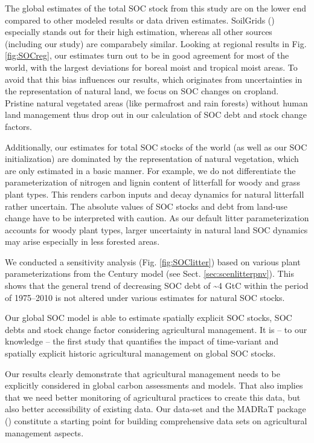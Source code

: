 \documentclass[gc, manuscript]{copernicus}
\begin{document}
The global estimates of the total SOC stock from this study are on the lower end compared to other modeled results or data driven estimates. SoilGrids (\citep{hengl_soilgrids250m_2017}) especially stands out for their high estimation, whereas all other sources (including our study) are comparabely similar. Looking at regional results in Fig. \ref{fig:SOCreg}, our estimates turn out to be in good agreement for most of the world, with the largest deviations for boreal moist and tropical moist areas. To avoid that this bias influences our results, which originates from uncertainties in the representation of natural land, we focus on SOC changes on cropland. Pristine natural vegetated areas (like permafrost and rain forests) without human land management thus drop out in our calculation of SOC debt and stock change factors.

Additionally, our estimates for total SOC stocks of the world (as well as our SOC initialization) are dominated by the representation of natural vegetation, which are only estimated in a basic manner. For example, we do not differentiate the parameterization of nitrogen and lignin content of litterfall for woody and grass plant types. This renders carbon inputs and decay dynamics for natural litterfall rather uncertain. The absolute values of SOC stocks and debt from land-use change have to be interpreted with caution. As our default litter parameterization accounts for woody plant types, larger uncertainty in natural land SOC dynamics may arise especially in less forested areas.

We conducted a sensitivity analysis (Fig. \ref{fig:SOClitter}) based on various plant parameterizations from the Century model (see Sect. \ref{sec:scenlitterpnv}). This shows that the general trend of decreasing SOC debt of \textasciitilde4 GtC within the period of 1975--2010 is not altered under various estimates for natural SOC stocks.
\newpage

\conclusions

Our global SOC model is able to estimate spatially explicit SOC stocks, SOC debts and stock change factor considering agricultural management. It is -- to our knowledge -- the first study that quantifies the impact of time-variant and spatially explicit historic agricultural management on global SOC stocks.

Our results clearly demonstrate that agricultural management needs to be explicitly considered in global carbon assessments and models. That also implies that we need better monitoring of agricultural practices to create this data, but also better accessibility of existing data. Our data-set and the MADRaT package (\citep{dietrich_madrat_2020}) constitute a starting point for building comprehensive data sets on agricultural management aspects.
\end{document}
